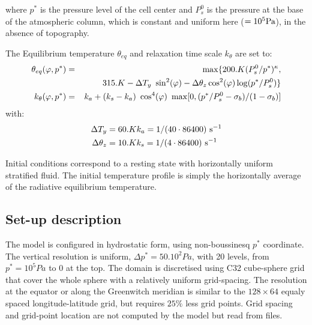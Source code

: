 where $p^*$ is the pressure level of the cell center 
and $P^{0}_{s}$ is the pressure at the base of the atmospheric column,
which is constant and uniform here ($= 10^5 {\rm Pa}$), in the absence 
of topography.

The Equilibrium temperature $\theta_{eq}$ and relaxation time scale $k_{\theta}$ 
are set to:
\begin{eqnarray}
\label{EQ:eg-hs-define_Teq}
\theta_{eq}(\varphi,p^*) & = & \max \{ 200.K (P^{0}_{s}/p^*)^\kappa,\\
\nonumber
& & \hspace{8mm} 315.K - \Delta T_y~\sin^2(\varphi) 
  - \Delta \theta_z \cos^2(\varphi) \log(p^*/P^{0}_s) \}
\\
\label{EQ:eg-hs-define_kT}
k_{\theta}(\varphi,p^*) & = &
k_a + (k_s -k_a)~\cos^4(\varphi)~\max[0,(p^*/P^{0}_{s}-\sigma_{b})/(1-\sigma_{b})]
\end{eqnarray}
with:
\begin{eqnarray*}
 \Delta T_y = 60.K & k_a = 1/(40 \cdot 86400) ~{\rm s}^{-1}\\
\Delta \theta_z = 10.K & k_s = 1/(4 \cdot 86400) ~{\rm s}^{-1}
\end{eqnarray*}

Initial conditions correspond to a resting state with horizontally uniform 
stratified fluid. The initial temperature profile is simply the 
horizontally average of the radiative equilibrium temperature.

\subsection{Set-up description}
\label{www:tutorials}

The model is configured in hydrostatic form, using non-boussinesq
$p^*$ coordinate.
The vertical resolution is uniform, $\Delta p^* = 50.10^2 Pa$,
with 20 levels, from $p^*=10^5 Pa$ to $0$ at the top.
The domain is discretised using C32 cube-sphere grid \cite[]{adcroft:04b}
that cover the whole sphere with a relatively uniform grid-spacing.
The resolution at the equator or along the Greenwitch meridian
is similar to the $128 \times 64$ equaly spaced longitude-latitude grid,
but requires $25\%$ less grid points.
Grid spacing and grid-point location are not computed by the model but
read from files.

